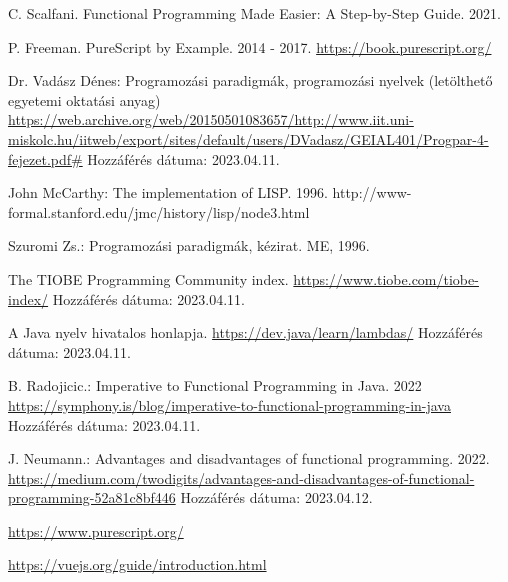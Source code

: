 \documentclass[12pt]{article}
\begin{document}
\newpage
\renewcommand{\refname}{Irodalomjegyzék}
\begin{thebibliography}{99}

C. Scalfani. Functional Programming Made Easier: A Step-by-Step Guide. 2021.

P. Freeman. PureScript by Example. 2014 - 2017.
\url{https://book.purescript.org/}

Dr. Vadász Dénes: Programozási paradigmák, programozási nyelvek (letölthető egyetemi oktatási anyag)
\url{https://web.archive.org/web/20150501083657/http://www.iit.uni-miskolc.hu/iitweb/export/sites/default/users/DVadasz/GEIAL401/Progpar-4-fejezet.pdf#}
Hozzáférés dátuma: 2023.04.11.

John McCarthy: The implementation of LISP. 1996.
http://www-formal.stanford.edu/jmc/history/lisp/node3.html

Szuromi Zs.: Programozási paradigmák, kézirat. ME, 1996.

The TIOBE Programming Community index. \url{https://www.tiobe.com/tiobe-index/} Hozzáférés dátuma: 2023.04.11.

A Java nyelv hivatalos honlapja. \url{https://dev.java/learn/lambdas/}  Hozzáférés dátuma: 2023.04.11.

B. Radojicic.: Imperative to Functional Programming in Java. 2022
\url{https://symphony.is/blog/imperative-to-functional-programming-in-java} Hozzáférés dátuma: 2023.04.11.

J. Neumann.: Advantages and disadvantages of functional programming. 2022.
\url{https://medium.com/twodigits/advantages-and-disadvantages-of-functional-programming-52a81c8bf446}
Hozzáférés dátuma: 2023.04.12.

\url{https://www.purescript.org/}

\url{https://vuejs.org/guide/introduction.html}

\end{thebibliography}
\end{document}
